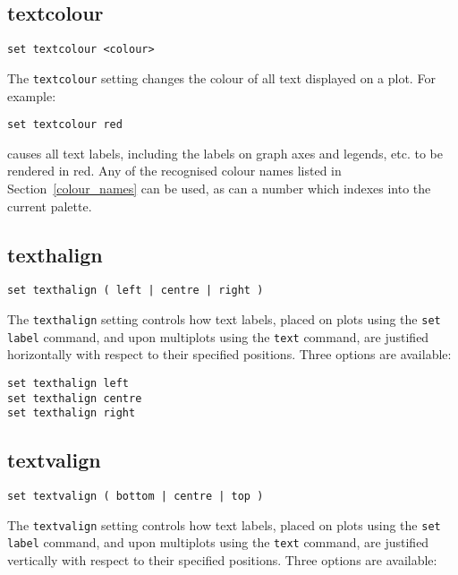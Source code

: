 \subsection{textcolour}

\begin{verbatim}
set textcolour <colour>
\end{verbatim}

The {\tt textcolour} setting changes the colour of all text displayed on a plot.
For example:

\begin{verbatim}
set textcolour red
\end{verbatim}

\noindent causes all text labels, including the labels on graph axes and
legends, etc. to be rendered in red. Any of the recognised colour names listed
in Section~\ref{colour_names} can be used, as can a number which indexes into
the current palette.

\subsection{texthalign}

\begin{verbatim}
set texthalign ( left | centre | right )
\end{verbatim}

The {\tt texthalign} setting controls how text labels, placed on plots using the
{\tt set label} command, and upon multiplots using the {\tt text} command, are
justified horizontally with respect to their specified positions. Three options
are available:

\begin{verbatim}
set texthalign left
set texthalign centre
set texthalign right
\end{verbatim}

\subsection{textvalign}

\begin{verbatim}
set textvalign ( bottom | centre | top )
\end{verbatim}

The {\tt textvalign} setting controls how text labels, placed on plots using the
{\tt set label} command, and upon multiplots using the {\tt text} command, are
justified vertically with respect to their specified positions. Three options
are available:

